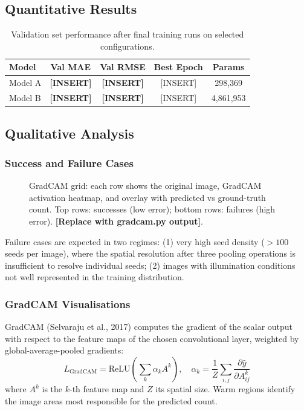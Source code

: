 \documentclass[11pt,a4paper]{article}
\begin{document}
\subsection{Quantitative Results}

\begin{table}[h]
\centering
\caption{Validation set performance after final training runs on selected configurations.}
\begin{tabular}{lcccc}
\toprule
Model & Val MAE & Val RMSE & Best Epoch & Params \\
\midrule
Model A & \textbf{[INSERT]} & \textbf{[INSERT]} & [INSERT] & 298,369 \\
Model B & \textbf{[INSERT]} & \textbf{[INSERT]} & [INSERT] & 4,861,953 \\
\bottomrule
\end{tabular}
\end{table}

\subsection{Qualitative Analysis}

\subsubsection{Success and Failure Cases}

\begin{figure}[h]
\centering
\fbox{\rule{0pt}{5cm}\rule{\linewidth}{0pt}}
\caption{GradCAM grid: each row shows the original image, GradCAM activation heatmap,
and overlay with predicted vs ground-truth count. Top rows: successes (low error);
bottom rows: failures (high error). \textbf{[Replace with gradcam.py output]}.}
\label{fig:gradcam}
\end{figure}

Failure cases are expected in two regimes: (1) very high seed density ($>100$ seeds per
image), where the spatial resolution after three pooling operations is insufficient to
resolve individual seeds; (2) images with illumination conditions not well represented in
the training distribution.

\subsubsection{GradCAM Visualisations}

GradCAM (Selvaraju et al., 2017) computes the gradient of the scalar output with respect
to the feature maps of the chosen convolutional layer, weighted by global-average-pooled
gradients:
\begin{equation}
  L_{\text{GradCAM}} = \text{ReLU}\!\left(\sum_k \alpha_k A^k\right),
  \quad
  \alpha_k = \frac{1}{Z}\sum_{i,j} \frac{\partial \hat{y}}{\partial A^k_{ij}}
\end{equation}
where $A^k$ is the $k$-th feature map and $Z$ its spatial size. Warm regions identify
the image areas most responsible for the predicted count.
\end{document}
